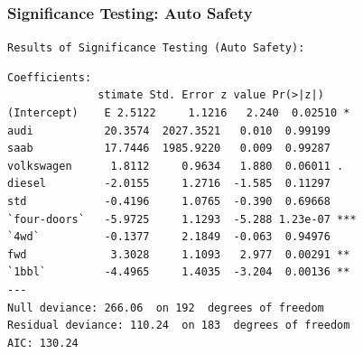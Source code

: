 \documentclass{beamer}
\begin{document}
\begin{frame}[fragile]
\frametitle{Significance Testing: Auto Safety}

\texttt{Results of Significance Testing (Auto Safety):}\\
\tiny{
\begin{verbatim}
Coefficients:
              stimate Std. Error z value Pr(>|z|)    
(Intercept)    E 2.5122     1.1216   2.240  0.02510 *  
audi           20.3574  2027.3521   0.010  0.99199    
saab           17.7446  1985.9220   0.009  0.99287    
volkswagen      1.8112     0.9634   1.880  0.06011 .  
diesel         -2.0155     1.2716  -1.585  0.11297    
std            -0.4196     1.0765  -0.390  0.69668    
`four-doors`   -5.9725     1.1293  -5.288 1.23e-07 ***
`4wd`          -0.1377     2.1849  -0.063  0.94976    
fwd             3.3028     1.1093   2.977  0.00291 ** 
`1bbl`         -4.4965     1.4035  -3.204  0.00136 ** 
---
Null deviance: 266.06  on 192  degrees of freedom
Residual deviance: 110.24  on 183  degrees of freedom
AIC: 130.24
\end{verbatim}
}
\end{frame}

\author[Q \& A]{
Christopher Patton, \texttt{cjpatton@ucdavis.edu}\\
Alex Rumbaugh, \texttt{aprumbaugh@ucdavis.edu}\\
Thomas Provan,\texttt{tcprovan@ucdavis.edu}\\
Olga Prilepova, \texttt{prilepova@gmail.com}\\
John Chen, \texttt{jhochen@ucdavis.edu}}

\begin{frame}
\titlepage
\end{frame}
\end{document}

